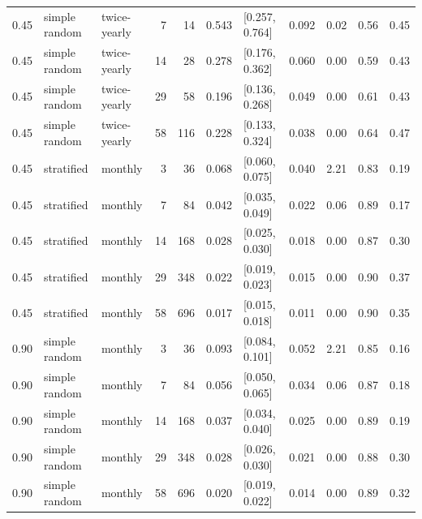 \documentclass[11pt,a4paper]{article}
\begin{document}
\begin{table}[htbp]
\begin{tabular}{@{}lllrrrlrrrr@{}}
0.45 & simple random & twice-yearly &  7 &  14 & 0.543 & [0.257, 0.764] & 0.092 & 0.02 & 0.56 & 0.45 \\
0.45 & simple random & twice-yearly & 14 &  28 & 0.278 & [0.176, 0.362] & 0.060 & 0.00 & 0.59 & 0.43 \\
0.45 & simple random & twice-yearly & 29 &  58 & 0.196 & [0.136, 0.268] & 0.049 & 0.00 & 0.61 & 0.43 \\
0.45 & simple random & twice-yearly & 58 & 116 & 0.228 & [0.133, 0.324] & 0.038 & 0.00 & 0.64 & 0.47 \\
0.45 & stratified & monthly &  3 &  36 & 0.068 & [0.060, 0.075] & 0.040 & 2.21 & 0.83 & 0.19 \\
0.45 & stratified & monthly &  7 &  84 & 0.042 & [0.035, 0.049] & 0.022 & 0.06 & 0.89 & 0.17 \\
0.45 & stratified & monthly & 14 & 168 & 0.028 & [0.025, 0.030] & 0.018 & 0.00 & 0.87 & 0.30 \\
0.45 & stratified & monthly & 29 & 348 & 0.022 & [0.019, 0.023] & 0.015 & 0.00 & 0.90 & 0.37 \\
0.45 & stratified & monthly & 58 & 696 & 0.017 & [0.015, 0.018] & 0.011 & 0.00 & 0.90 & 0.35 \\
0.90 & simple random & monthly &  3 &  36 & 0.093 & [0.084, 0.101] & 0.052 & 2.21 & 0.85 & 0.16 \\
0.90 & simple random & monthly &  7 &  84 & 0.056 & [0.050, 0.065] & 0.034 & 0.06 & 0.87 & 0.18 \\
0.90 & simple random & monthly & 14 & 168 & 0.037 & [0.034, 0.040] & 0.025 & 0.00 & 0.89 & 0.19 \\
0.90 & simple random & monthly & 29 & 348 & 0.028 & [0.026, 0.030] & 0.021 & 0.00 & 0.88 & 0.30 \\
0.90 & simple random & monthly & 58 & 696 & 0.020 & [0.019, 0.022] & 0.014 & 0.00 & 0.89 & 0.32 \\
\bottomrule
\end{tabular}
\end{table}
\end{document}
